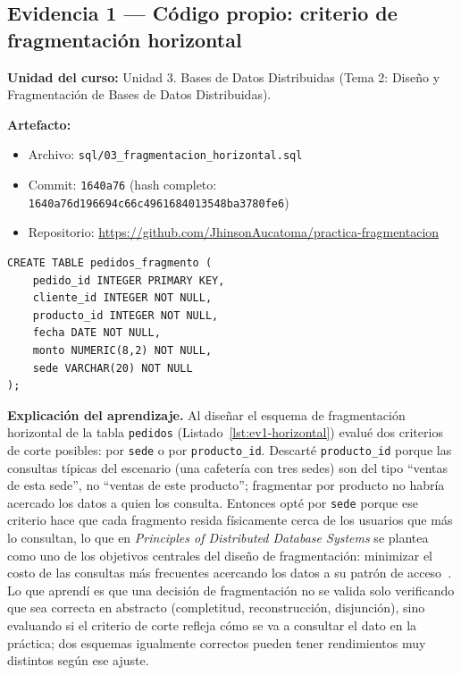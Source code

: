 \documentclass[11pt]{article}
\begin{document}
    \subsection{Evidencia 1 --- Código propio: criterio de fragmentación horizontal}

    \noindent\textbf{Unidad del curso:} Unidad 3. Bases de Datos Distribuidas (Tema 2: Diseño y Fragmentación de Bases de Datos Distribuidas).

    \noindent\textbf{Artefacto:}
    \begin{itemize}[noitemsep,topsep=2pt]
  \item Archivo: \texttt{sql/03\_fragmentacion\_horizontal.sql}
  \item Commit: \texttt{1640a76} (hash completo: \texttt{1640a76d196694c66c4961684013548ba3780fe6})
  \item Repositorio: \url{https://github.com/JhinsonAucatoma/practica-fragmentacion}
    \end{itemize}

    \begin{lstlisting}[caption={Fragmento de \texttt{03\_fragmentacion\_horizontal.sql}: esquema del fragmento horizontal de \texttt{pedidos}.}, label={lst:ev1-horizontal}]
CREATE TABLE pedidos_fragmento (
    pedido_id INTEGER PRIMARY KEY,
    cliente_id INTEGER NOT NULL,
    producto_id INTEGER NOT NULL,
    fecha DATE NOT NULL,
    monto NUMERIC(8,2) NOT NULL,
    sede VARCHAR(20) NOT NULL
);
    \end{lstlisting}

    \noindent\textbf{Explicación del aprendizaje.}
    Al diseñar el esquema de fragmentación horizontal de la tabla \texttt{pedidos} (Listado~\ref{lst:ev1-horizontal})
    evalué dos criterios de corte posibles: por \texttt{sede} o por \texttt{producto\_id}. Descarté \texttt{producto\_id}
    porque las consultas típicas del escenario (una cafetería con tres sedes) son del tipo ``ventas de esta sede'', no ``ventas de este producto'';
    fragmentar por producto no habría acercado los datos a quien los consulta. Entonces opté por \texttt{sede} porque ese criterio hace que cada
    fragmento resida físicamente cerca de los usuarios que más lo consultan, lo que en \emph{Principles of Distributed Database Systems} se plantea
    como uno de los objetivos centrales del diseño de fragmentación: minimizar el costo de las consultas más frecuentes acercando los datos a su patrón
    de acceso~\cite{ozsu2020principles}. Lo que aprendí es que una decisión de fragmentación no se valida solo verificando que sea correcta en abstracto
    (completitud, reconstrucción, disjunción), sino evaluando si el criterio de corte refleja cómo se va a consultar el dato en la práctica; dos esquemas
    igualmente correctos pueden tener rendimientos muy distintos según ese ajuste.
\end{document}
